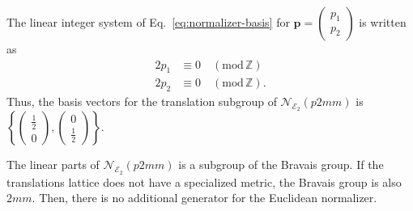 The linear integer system of Eq.~\eqref{eq:normalizer-basis} for $\bm{p} = \begin{pmatrix} p_{1} \\ p_{2} \end{pmatrix}$ is written as
\begin{align*}
  2 p_{1} &\equiv 0 \quad (\mathrm{mod} \, \mathbb{Z}) \\
  2 p_{2} &\equiv 0 \quad (\mathrm{mod} \, \mathbb{Z}).
\end{align*}
Thus, the basis vectors for the translation subgroup of $\mathcal{N}_{\mathcal{E}_{2}}(p2mm)$ is
$\left\{ \begin{pmatrix} \frac{1}{2} \\ 0 \end{pmatrix}, \begin{pmatrix} 0 \\ \frac{1}{2} \end{pmatrix} \right\}$.

The linear parts of $\mathcal{N}_{\mathcal{E}_{2}}(p2mm)$ is a subgroup of the Bravais group.
If the translations lattice does not have a specialized metric, the Bravais group is also $2mm$.
Then, there is no additional generator for the Euclidean normalizer.


